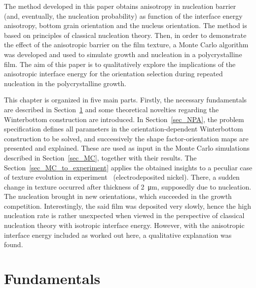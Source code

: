 The method developed in this paper obtains anisotropy in nucleation barrier (and, eventually, the nucleation probability) as function of the interface energy anisotropy, bottom grain orientation and the nucleus orientation. The method is based on principles of classical nucleation theory. Then, in order to demonstrate the effect of the anisotropic barrier on the film texture, a Monte Carlo algorithm was developed and used to simulate growth and nucleation in a polycrystalline film. The aim of this paper is to qualitatively explore the implications of the anisotropic interface energy for the orientation selection during repeated nucleation in the polycrystalline growth. 

This chapter is organized in five main parts. Firstly, the necessary fundamentals are described in Section~\ref{sec_NPA_Fundamentals} and some theoretical novelties regarding the Winterbottom construction are introduced. In Section~\ref{sec_NPA}, the problem specification defines all parameters in the orientation-dependent Winterbottom construction to be solved, and successively the shape factor-orientation maps are presented and explained. These are used as input in the Monte Carlo simulations described in Section~\ref{sec_MC}, together with their results. The Section~\ref{sec_MC_to_experiment} applies the obtained insights to a peculiar case of texture evolution in experiment~\cite{Alimadadi2016} (electrodeposited nickel). There, a sudden change in texture occurred after thickness of \qty{2}{\um}, supposedly due to nucleation. The nucleation brought in new orientations, which succeeded in the growth competition. Interestingly, the said film was deposited very slowly, hence the high nucleation rate is rather unexpected when viewed in the perspective of classical nucleation theory with isotropic interface energy. However, with the anisotropic interface energy included as worked out here, a qualitative explanation was found. 

\section{Fundamentals}\label{sec_NPA_Fundamentals}
